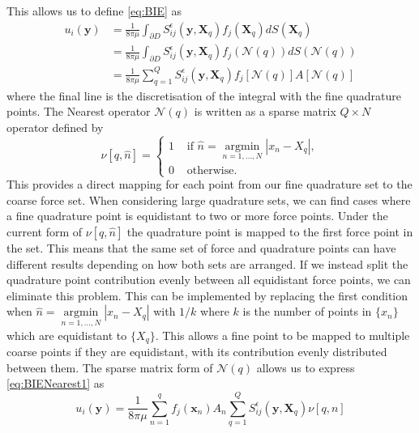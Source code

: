 This allows us to define \cref{eq:BIE} as 
\begin{equation}
\begin{aligned}
\label{eq:BIENearest1}
        u_i(\bm{y}) &= \frac{1}{8 \pi \mu} \int_{\partial D} S_{i j}^{\epsilon}\left(\bm{y}, \bm{X}_q\right) f_{j}(\bm{X}_q) d S(\bm{X}_q) \\
        &= \frac{1}{8 \pi \mu} \int_{\partial D} S_{i j}^{\epsilon}\left(\bm{y}, \bm{X}_q\right) f_{j}(\mathcal{N}(q)) d S(\mathcal{N}(q)) \\
        & = \frac{1}{8 \pi \mu} \sum_{q=1}^Q S_{i j}^{\epsilon}\left(\bm{y}, \bm{X}_q\right){f_{j}}[\mathcal{N}(q)]A[\mathcal{N}(q)]
\end{aligned}
\end{equation}
where the final line is the discretisation of the integral with the fine quadrature points. The Nearest operator $\mathcal{N}(q)$ is written as a sparse matrix $Q \times N$ operator defined by
\begin{equation}
\label{eq:NNMatrix}
    \nu [q, \hat{n}]= \begin{cases} 1 & \text { if } \hat{n}=\underset{n=1, \ldots, N}{\operatorname{argmin}}|x_n-X_q| , \\ 0 & \text { otherwise. }\end{cases}
\end{equation}
This provides a direct mapping for each point from our fine quadrature set to the coarse force set. When considering large quadrature sets, we can find cases where a fine quadrature point is equidistant to two or more force points. Under the current form of $\nu [q, \hat{n}]$ the quadrature point is mapped to the first force point in the set. This means that the same set of force and quadrature points can have different results depending on how both sets are arranged. If we instead split the quadrature point contribution evenly between all equidistant force points, we can eliminate this problem. This can be implemented by replacing the first condition when $\hat{n}=\underset{n=1, \ldots, N}{\operatorname{argmin}}|x_n-X_q|$ with $1/k$ where $k$ is the number of points in $\{x_n\}$ which are equidistant to $\{X_q\}$. This allows a fine point to be mapped to multiple coarse points if they are equidistant, with its contribution evenly distributed between them. The sparse matrix form of $\mathcal{N}(q)$ allows us to express \cref{eq:BIENearest1} as 
\begin{equation}
    u_i(\bm{y}) = \frac{1}{8 \pi \mu} \sum_{n=1}^q  f_{j}(\bm{x}_n) A_n \sum_{q=1}^{Q}S_{i j}^{\epsilon}\left(\bm{y}, \bm{X}_q\right) \nu[q,n] 
\end{equation}
